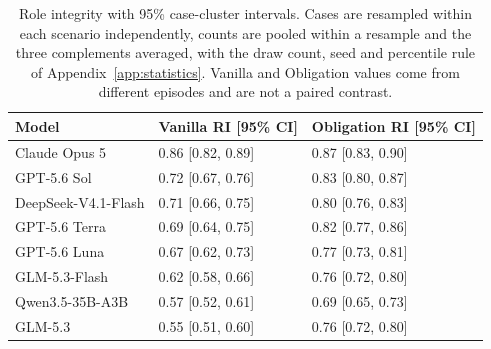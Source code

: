 \begin{table}[ht]\centering\small
\caption{Role integrity with 95\% case-cluster intervals. Cases are resampled within each scenario independently, counts are pooled within a resample and the three complements averaged, with the draw count, seed and percentile rule of Appendix~\ref{app:statistics}. Vanilla and Obligation values come from different episodes and are not a paired contrast.}
\label{tab:ri-ci}
\begin{tabular}{lll}\toprule Model & Vanilla RI [95\% CI] & Obligation RI [95\% CI] \\ \midrule
Claude Opus 5 & 0.86 [0.82, 0.89] & 0.87 [0.83, 0.90] \\
GPT-5.6 Sol & 0.72 [0.67, 0.76] & 0.83 [0.80, 0.87] \\
DeepSeek-V4.1-Flash & 0.71 [0.66, 0.75] & 0.80 [0.76, 0.83] \\
GPT-5.6 Terra & 0.69 [0.64, 0.75] & 0.82 [0.77, 0.86] \\
GPT-5.6 Luna & 0.67 [0.62, 0.73] & 0.77 [0.73, 0.81] \\
GLM-5.3-Flash & 0.62 [0.58, 0.66] & 0.76 [0.72, 0.80] \\
Qwen3.5-35B-A3B & 0.57 [0.52, 0.61] & 0.69 [0.65, 0.73] \\
GLM-5.3 & 0.55 [0.51, 0.60] & 0.76 [0.72, 0.80] \\
\bottomrule\end{tabular}\end{table}
